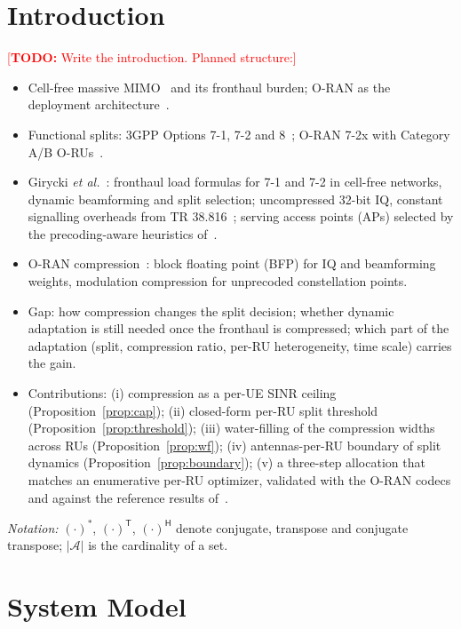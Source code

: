 \documentclass[10pt, final, journal, letterpaper, twocolumn]{IEEEtran}
\newcommand{\todo}[1]{\textcolor{red}{[\textbf{TODO:} #1]}}
\begin{document}
\glsresetall
\section{Introduction}
\label{sec:introduction}

\todo{Write the introduction. Planned structure:}
\begin{itemize}
  \item Cell-free massive MIMO~\cite{ngo2017cellfree,interdonato2019ubiquitous,ref2} and its fronthaul burden; O-RAN as the deployment architecture~\cite{polese2023oran}.
  \item Functional splits: 3GPP Options 7-1, 7-2 and 8~\cite{tr38801,tr38816}; O-RAN 7-2x with Category A/B O-RUs~\cite{oran_cus_v22}.
  \item Girycki \emph{et al.}~\cite{girycki2024eucnc}: fronthaul load formulas for 7-1 and 7-2 in cell-free networks, dynamic beamforming and split selection; uncompressed 32-bit IQ, constant signalling overheads from TR 38.816~\cite{tr38816}; serving access points (APs) selected by the precoding-aware heuristics of~\cite{girycki2024twc}.
  \item O-RAN compression~\cite{oran_cus_v22,lagen2021modcomp,ref3}: block floating point (BFP) for IQ and beamforming weights, modulation compression for unprecoded constellation points.
  \item Gap: how compression changes the split decision; whether dynamic adaptation is still needed once the fronthaul is compressed; which part of the adaptation (split, compression ratio, per-RU heterogeneity, time scale) carries the gain.
  \item Contributions: (i) compression as a per-UE SINR ceiling (Proposition~\ref{prop:cap}); (ii) closed-form per-RU split threshold (Proposition~\ref{prop:threshold}); (iii) water-filling of the compression widths across RUs (Proposition~\ref{prop:wf}); (iv) antennas-per-RU boundary of split dynamics (Proposition~\ref{prop:boundary}); (v) a three-step allocation that matches an enumerative per-RU optimizer, validated with the O-RAN codecs and against the reference results of~\cite{girycki2024eucnc}.
\end{itemize}

\emph{Notation:} $(\cdot)^{*}$, $(\cdot)^{\mathsf{T}}$, $(\cdot)^{\mathsf{H}}$ denote conjugate, transpose and conjugate transpose; $|\mathcal{A}|$ is the cardinality of a set.

\section{System Model}
\label{sec:system}
\end{document}
